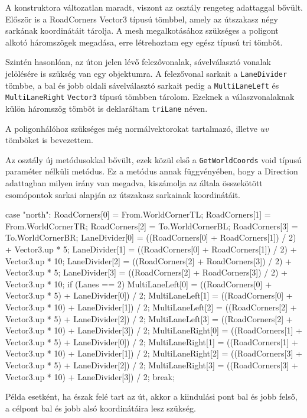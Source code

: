 A konstruktora változatlan maradt, viszont az osztály rengeteg adattaggal bővült. Először is a RoadCorners Vector3 típusú tömbbel, amely az útszakasz négy sarkának koordinátáit tárolja. A mesh megalkotásához szükséges a poligont alkotó háromszögek megadása, erre létrehoztam egy egész típusú tri tömböt.

Szintén hasonlóan, az úton jelen lévő felezővonalak, sávelválasztó vonalak jelölésére is szükség van egy objektumra. A felezővonal sarkait a \texttt{LaneDivider} tömbbe, a bal és jobb oldali sávelválasztó sarkait pedig a \texttt{MultiLaneLeft} és \texttt{MultiLaneRight} \texttt{Vector3} típusú tömbben tárolom. Ezeknek a válaszvonalaknak külön háromszög tömböt is deklaráltam \texttt{triLane} néven.

A poligonhálóhoz szükséges még normálvektorokat tartalmazó, illetve \textit{uv} tömböket is bevezettem.

Az osztály új metódusokkal bővült, ezek közül első a \texttt{GetWorldCoords} void típusú paraméter nélküli metódus. Ez a metódus annak függvényében, hogy a Direction adattagban milyen irány van megadva, kiszámolja az általa összekötött csomópontok sarkai alapján az útszakasz sarkainak koordinátáit.
\begin{cpp}
case "north":
                    RoadCorners[0] = From.WorldCornerTL;
                    RoadCorners[1] = From.WorldCornerTR;
                    RoadCorners[2] = To.WorldCornerBL;
                    RoadCorners[3] = To.WorldCornerBR;
                    LaneDivider[0] = ((RoadCorners[0] + 
                    RoadCorners[1]) / 2) + Vector3.up * 5;
                    LaneDivider[1] = ((RoadCorners[0] + 
                    RoadCorners[1]) / 2) + Vector3.up * 10;
                    LaneDivider[2] = ((RoadCorners[2] +
                     RoadCorners[3]) / 2) + Vector3.up * 5;
                    LaneDivider[3] = ((RoadCorners[2] + 
                    RoadCorners[3]) / 2) + Vector3.up * 10;
                    if (Lanes == 2)
                    {
                        MultiLaneLeft[0] = ((RoadCorners[0] + 
                        Vector3.up * 5) + LaneDivider[0]) / 2;
                        MultiLaneLeft[1] = ((RoadCorners[0] + 
                        Vector3.up * 10) + LaneDivider[1]) / 2;
                        MultiLaneLeft[2] = ((RoadCorners[2] + 
                        Vector3.up * 5) + LaneDivider[2]) / 2;
                        MultiLaneLeft[3] = ((RoadCorners[2] +
                        Vector3.up * 10) + LaneDivider[3]) / 2;
                        MultiLaneRight[0] = ((RoadCorners[1] + 
                        Vector3.up * 5) + LaneDivider[0]) / 2;
                        MultiLaneRight[1] = ((RoadCorners[1] + 
                        Vector3.up * 10) + LaneDivider[1]) / 2;
                        MultiLaneRight[2] = ((RoadCorners[3] + 
                        Vector3.up * 5) + LaneDivider[2]) / 2;
                        MultiLaneRight[3] = ((RoadCorners[3] + 
                        Vector3.up * 10) + LaneDivider[3]) / 2;
                    }
                    break;
\end{cpp}
Példa esetként, ha észak felé tart az út, akkor a kiindulási pont bal és jobb felső, a célpont bal és jobb alsó koordinátáira lesz szükség.

